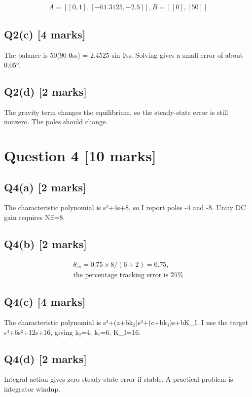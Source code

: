 \documentclass[11pt,a4paper]{article}
\begin{document}
\[\begin{aligned}A = [[0,1], [-61.3125,-2.5]], B = [[0],[50]]\end{aligned}\]

\subsection*{Q2(c) \hfill [4 marks]}

The balance is 50(90-θss) = 2.4525 sin θss.
Solving gives a small error of about 0.05°.

\subsection*{Q2(d) \hfill [2 marks]}

The gravity term changes the equilibrium, so the steady-state error is still nonzero.
The poles should change.

\section*{Question 4 \hfill [10 marks]}
\subsection*{Q4(a) \hfill [2 marks]}

The characteristic polynomial is s²+4s+8, so I report poles -4 and -8.
Unity DC gain requires Nff=8.

\subsection*{Q4(b) \hfill [2 marks]}

\[\begin{aligned}\theta_{ss} = 0.75\times8/(6+2)=0.75,\\ \text{the percentage tracking error is 25\%}\end{aligned}\]

\subsection*{Q4(c) \hfill [4 marks]}

The characteristic polynomial is s³+(a+bk₂)s²+(c+bk₁)s+bK\_I.
I use the target s³+6s²+12s+16, giving k₂=4, k₁=6, K\_I=16.

\subsection*{Q4(d) \hfill [2 marks]}

Integral action gives zero steady-state error if stable.
A practical problem is integrator windup.
\end{document}

